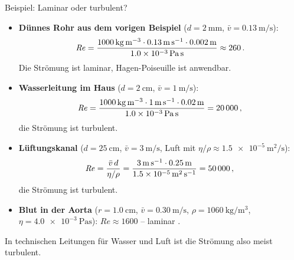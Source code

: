 \begin{examplebox}[]{Beispiel: Laminar oder turbulent?}
    \begin{itemize}[itemsep=3pt]
        \item \textbf{Dünnes Rohr aus dem vorigen Beispiel} ($d = \SI{2}{\milli\meter}$, $\bar{v} = \SI{0.13}{\meter\per\second}$):
        \begin{equation*}
            \mathit{Re} = \frac{\SI{1000}{\kilogram\per\meter\cubed} \cdot \SI{0.13}{\meter\per\second} \cdot \SI{0.002}{\meter}}{\SI{1.0e-3}{\pascal\second}} \approx 260 \,.
        \end{equation*}
        Die Strömung ist laminar, Hagen-Poiseuille ist anwendbar.
        \item \textbf{Wasserleitung im Haus} ($d = \SI{2}{\centi\meter}$, $\bar{v} = \SI{1}{\meter\per\second}$):
        \begin{equation*}
            \mathit{Re} = \frac{\SI{1000}{\kilogram\per\meter\cubed} \cdot \SI{1}{\meter\per\second} \cdot \SI{0.02}{\meter}}{\SI{1.0e-3}{\pascal\second}} = \num{20000} \,{,}\,
        \end{equation*}
        die Strömung ist turbulent.
        \item \textbf{Lüftungskanal} ($d = \SI{25}{\centi\meter}$, $\bar{v} = \SI{3}{\meter\per\second}$, Luft mit $\eta/\rho \approx \SI{1.5e-5}{\meter\squared\per\second}$):
        \begin{equation*}
            \mathit{Re} = \frac{\bar{v}\, d}{\eta/\rho} = \frac{\SI{3}{\meter\per\second} \cdot \SI{0.25}{\meter}}{\SI{1.5e-5}{\meter\squared\per\second}} = \num{50000} \,{,}\,
        \end{equation*}
        die Strömung ist turbulent.
        \item \textbf{Blut in der Aorta} ($r = \SI{1.0}{\centi\meter}$, $\bar{v} = \SI{0.30}{\meter\per\second}$, $\rho = \SI{1060}{\kilogram\per\meter\cubed}$, $\eta = \SI{4.0e-3}{\pascal\second}$): $\mathit{Re} \approx 1600$ -- laminar \cite[S.~399]{Tipler2015}.
    \end{itemize}
    In technischen Leitungen für Wasser und Luft ist die Strömung also meist turbulent.
\end{examplebox}

